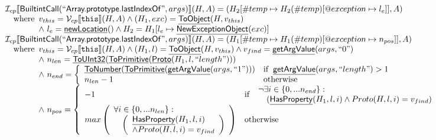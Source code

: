\documentclass{article}
\makeatletter
\newcommand{\SF}[1]{\mbox{\textsf{#1}}}
\newcommand{\TT}[1]{\mbox{\texttt{#1}}}
\newcommand{\wherec}[1]{{\rm where}\begin{array}[t]{l}#1\end{array}}
\newcommand{\ifc}[1]{{\rm if}\begin{array}[t]{l}#1\end{array}}
\newcommand{\owc}{{\rm otherwise}}
\newcommand{\I}{\mathcal{I}}
\newcommand{\V}{\mathcal{V}}
\newcommand{\lbr}{\llbracket}
\newcommand{\rbr}{\rrbracket}
\newcommand{\hf}[1]{\underline{\sf #1}}
\newcommand{\varloc}[1]{\##1}
\newcommand{\varprop}[1]{@#1}
\makeatother
\begin{document}
\[
\begin{array}{l}
\I _{cp}\lbr \SF{BuiltintCall}(``\SF{Array.prototype.lastIndexOf}",args)\rbr(H,A)
 = (H_2[\varloc{temp}\mapsto H_2(\varloc{temp})[\varprop{exception}\mapsto l_e]], A) \\
\quad\wherec{
  v_{this} = \V _{cp}\lbr \TT{this}\rbr (H,A) \land (H_1,exc) = \hf{ToObject}(H,v_{this})\\
  \land\ l_e = \hf{newLocation}() \land H_2=H_1[l_e\mapsto\hf{NewExceptionObject}(exc)] 
  }\\
  
\I _{cp}\lbr \SF{BuiltintCall}(``\SF{Array.prototype.lastIndexOf}",args)\rbr(H,A)
 = (H_1[\varloc{temp}\mapsto H_1(\varloc{temp})[\varprop{exception}\mapsto n_{pos}]], A) \\
\quad\wherec{
  v_{this} = \V _{cp}\lbr \TT{this}\rbr (H,A) \land (H_1,l) = \hf{ToObject}(H,v_{this})
  \land v_{find} = \hf{getArgValue}(args,``0")\\
  \land\ n_{len} = \hf{ToUInt32}(\hf{ToPrimitive}(\hf{Proto}(H_1, l, ``length")))\\
  \land\ n_{end} = \left\{\begin{array}{ll}
      \hf{ToNumber}(\hf{ToPrimitive}(\hf{getArgValue}(args, ``1")))
      & \ifc{\hf{getArgValue}(args, ``length") > 1}\\
      n_{len}-1 & \owc\\
    \end{array}\right.\\
  \land\ n_{pos} = \left\{\begin{array}{ll}
      -1 & \ifc{\begin{array}{l}
        \neg\exists i \in \{0,...n_{end}\}:\\
        \quad(\hf{HasProperty}(H_1,l,i) \land Proto(H,l,i) = v_{find})\end{array}}\\
      max\left(\begin{array}{l}
        \forall i \in \{0,...n_{len}\}:\\
        \quad\left(\begin{array}{l}
          \hf{HasProperty}(H_1,l,i)\\
          \land Proto(H,l,i) = v_{find}\end{array}\right)\end{array}\right) & \owc
    \end{array}\right.\\
  }\\
\\\\

\end{array}
\]
\end{document}
